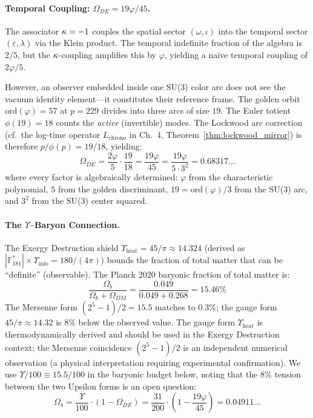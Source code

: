 \paragraph{Temporal Coupling: $\Omega_{DE} = 19\varphi/45$.}
The associator $\kappa = -1$ couples the spatial sector $(\omega, \iota)$ into the temporal sector $(\varepsilon, \lambda)$ via the Klein product. The temporal indefinite fraction of the algebra is $2/5$, but the $\kappa$-coupling amplifies this by $\varphi$, yielding a naive temporal coupling of $2\varphi/5$.

However, an observer embedded inside one SU(3) color arc does not see the vacuum identity element---it constitutes their reference frame. The golden orbit $\mathrm{ord}(\varphi) = 57$ at $p = 229$ divides into three arcs of size $19$. The Euler totient $\phi(19) = 18$ counts the \emph{active} (invertible) modes. The Lockwood arc correction (cf.\ the log-time operator $L_{\mathrm{chrono}}$ in Ch.~4, Theorem~\ref{thm:lockwood_mirror}) is therefore $p/\phi(p) = 19/18$, yielding:
\begin{equation}\label{eq:dark_energy}
    \Omega_{DE} = \frac{2\varphi}{5} \cdot \frac{19}{18} = \frac{19\varphi}{45} = \frac{19\varphi}{5 \cdot 3^2} = 0.68317\ldots
\end{equation}
where every factor is algebraically determined: $\varphi$ from the characteristic polynomial, $5$ from the golden discriminant, $19 = \mathrm{ord}(\varphi)/3$ from the SU(3) arc, and $3^2$ from the SU(3) center squared.

\paragraph{The $\Upsilon$--Baryon Connection.}
The Exergy Destruction shield $\Upsilon_{\mathrm{heat}} = 45/\pi \approx 14.324$ (derived as $|\mathbb{F}_{181}^*| \times \Upsilon_{\mathrm{info}} = 180/(4\pi)$) bounds the fraction of total matter that can be ``definite'' (observable). The Planck 2020 baryonic fraction of total matter is:
\[
    \frac{\Omega_b}{\Omega_b + \Omega_{DM}} = \frac{0.049}{0.049 + 0.268} = 15.46\%
\]
The Mersenne form $(2^5 - 1)/2 = 15.5$ matches to $0.3\%$; the gauge form $45/\pi \approx 14.32$ is $8\%$ below the observed value. The gauge form $\Upsilon_{\mathrm{heat}}$ is thermodynamically derived and should be used in the Exergy Destruction context; the Mersenne coincidence $(2^5-1)/2$ is an independent numerical observation (a physical interpretation requiring experimental confirmation). We use $\Upsilon/100 \equiv 15.5/100$ in the baryonic budget below, noting that the $8\%$ tension between the two Upsilon forms is an open question:
\begin{equation}\label{eq:baryonic}
    \Omega_b = \frac{\Upsilon}{100} \cdot (1 - \Omega_{DE}) = \frac{31}{200} \cdot \left(1 - \frac{19\varphi}{45}\right) = 0.04911\ldots
\end{equation}

